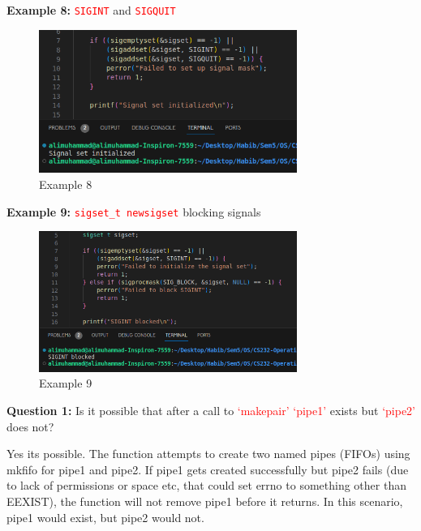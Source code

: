 \documentclass[addpoints]{exam}
\begin{document}
\begin{questions}
    \question
    \textbf{Example 8:} \texttt{\textcolor{red}{SIGINT}} and \texttt{\textcolor{red}{SIGQUIT}}
    \begin{figure}[H]
        \centering
        \includegraphics[width=0.75\textwidth]{eg8.png}
        \caption*{Example 8}
    \end{figure}
    
    \question
    \textbf{Example 9:} \texttt{\textcolor{red}{sigset\_t newsigset}} blocking signals
    \begin{figure}[H]
        \centering
        \includegraphics[width=0.75\textwidth]{eg9.png}
        \caption*{Example 9}
    \end{figure}
    
    \pagebreak
    \question
    \textbf{Question 1:} Is it possible that after a call to \textcolor{red}{`makepair'} \textcolor{red}{`pipe1'} exists but \textcolor{red}{`pipe2'} does not?
    \begin{solution}
        Yes its possible. The function attempts to create two named pipes (FIFOs) using mkfifo for pipe1 and pipe2. If pipe1 gets created successfully but pipe2 fails (due to lack of permissions or space etc, that could set errno to something other than EEXIST), the function will not remove pipe1 before it returns. In this scenario, pipe1 would exist, but pipe2 would not.
    \end{solution}


\end{questions}
\end{document}
